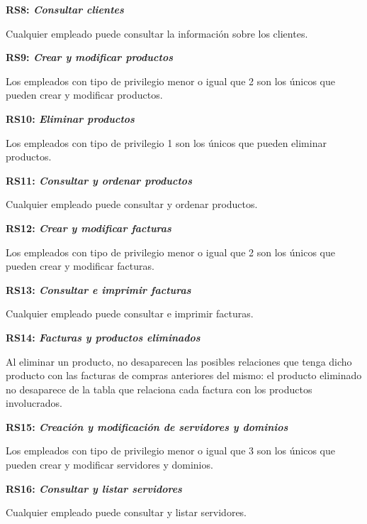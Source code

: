 \documentclass[paper=a4, fontsize=11pt, spanish]{scrartcl}
\begin{document}
\setlength{\parindent}{0em}
\textbf{RS8: \textit{Consultar clientes}}
\setlength{\parindent}{2em}

Cualquier empleado puede consultar la información sobre los clientes.

\setlength{\parindent}{0em}
\textbf{RS9: \textit{Crear y modificar productos}}
\setlength{\parindent}{2em}

Los empleados con tipo de privilegio menor o igual que 2 son los únicos que pueden crear y modificar productos.

\setlength{\parindent}{0em}
\textbf{RS10: \textit{Eliminar productos}}
\setlength{\parindent}{2em}

Los empleados con tipo de privilegio 1 son los únicos que pueden eliminar productos.

\setlength{\parindent}{0em}
\textbf{RS11: \textit{Consultar y ordenar productos}}
\setlength{\parindent}{2em}

Cualquier empleado puede consultar y ordenar productos.

\setlength{\parindent}{0em}
\textbf{RS12: \textit{Crear y modificar facturas}}
\setlength{\parindent}{2em}

Los empleados con tipo de privilegio menor o igual que 2 son los únicos que pueden crear y modificar facturas.

\setlength{\parindent}{0em}
\textbf{RS13: \textit{Consultar e imprimir facturas}}
\setlength{\parindent}{2em}

Cualquier empleado puede consultar e imprimir facturas.

\setlength{\parindent}{0em}
\textbf{RS14: \textit{Facturas y productos eliminados}}
\setlength{\parindent}{2em}

Al eliminar un producto, no desaparecen las posibles relaciones que tenga dicho producto con las facturas de compras anteriores del mismo: el producto eliminado no desaparece de la tabla que relaciona cada factura con los productos involucrados.

\setlength{\parindent}{0em}
\textbf{RS15: \textit{Creación y modificación de servidores y dominios}}
\setlength{\parindent}{2em}

Los empleados con tipo de privilegio menor o igual que 3 son los únicos que pueden crear y modificar servidores y dominios.

\setlength{\parindent}{0em}
\textbf{RS16: \textit{Consultar y listar servidores}}
\setlength{\parindent}{2em}

Cualquier empleado puede consultar y listar servidores.
\end{document}
